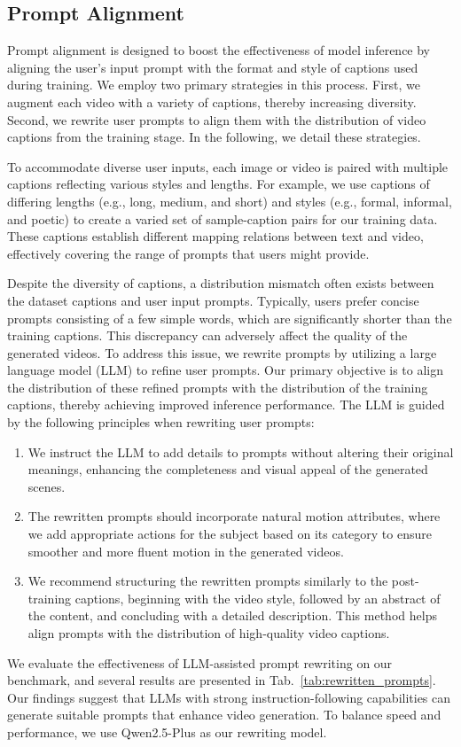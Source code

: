 \subsection{Prompt Alignment}
\label{sec:alignment}
Prompt alignment is designed to boost the effectiveness of model inference by aligning the user's input prompt with the format and style of captions used during training.
We employ two primary strategies in this process.
First, we augment each video with a variety of captions, thereby increasing diversity.
Second, we rewrite user prompts to align them with the distribution of video captions from the training stage. In the following, we detail these strategies.

To accommodate diverse user inputs, each image or video is paired with multiple captions reflecting various styles and lengths. For example, we use captions of differing lengths (e.g., long, medium, and short) and styles (e.g., formal, informal, and poetic) to create a varied set of sample-caption pairs for our training data. These captions establish different mapping relations between text and video, effectively covering the range of prompts that users might provide.

Despite the diversity of captions, a distribution mismatch often exists between the dataset captions and user input prompts. 
%
Typically, users prefer concise prompts consisting of a few simple words, which are significantly shorter than the training captions. This discrepancy can adversely affect the quality of the generated videos. 
%
To address this issue, we rewrite prompts by utilizing a large language model (LLM) to refine user prompts. 
%
Our primary objective is to align the distribution of these refined prompts with the distribution of the training captions, thereby achieving improved inference performance.
The LLM is guided by the following principles when rewriting user prompts:
\begin{enumerate}
    \item We instruct the LLM to add details to prompts without altering their original meanings, enhancing the completeness and visual appeal of the generated scenes.
    \item The rewritten prompts should incorporate natural motion attributes, where we add appropriate actions for the subject based on its category to ensure smoother and more fluent motion in the generated videos.
    \item We recommend structuring the rewritten prompts similarly to the post-training captions, beginning with the video style, followed by an abstract of the content, and concluding with a detailed description. This method helps align prompts with the distribution of high-quality video captions.
\end{enumerate}

We evaluate the effectiveness of LLM-assisted prompt rewriting on our benchmark, and several results are presented in Tab.~\ref{tab:rewritten_prompts}.
Our findings suggest that LLMs with strong instruction-following capabilities can generate suitable prompts that enhance video generation. To balance speed and performance, we use Qwen2.5-Plus as our rewriting model.

